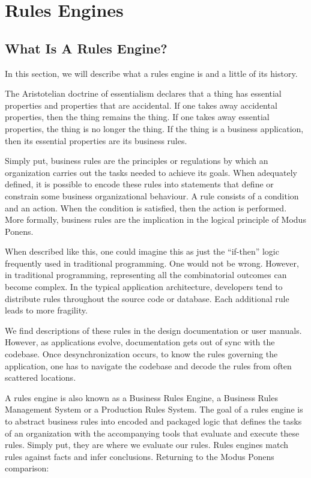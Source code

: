 \section{Rules Engines}

\subsection{What Is A Rules Engine?}

In this section, we will describe what a rules engine is and a little of its history.

The Aristotelian doctrine of essentialism declares that a thing has essential properties and properties that are accidental.
If one takes away accidental properties, then the thing remains the thing.
If one takes away essential properties, the thing is no longer the thing.
If the thing is a business application, then its essential properties are its business rules.

Simply put, business rules are the principles or regulations by which an organization carries out the tasks needed to achieve its goals.
When adequately defined, it is possible to encode these rules into statements that define or constrain some business organizational behaviour.
A rule consists of a condition and an action.
When the condition is satisfied, then the action is performed.
More formally, business rules are the implication in the logical principle of Modus Ponens.

When described like this, one could imagine this as just the ``if-then'' logic frequently used in traditional programming.
One would not be wrong. 
However, in traditional programming, representing all the combinatorial outcomes can become complex.
In the typical application architecture, developers tend to distribute rules throughout the source code or database.
Each additional rule leads to more fragility.

We find descriptions of these rules in the design documentation or user manuals.
However, as applications evolve, documentation gets out of sync with the codebase.
Once desynchronization occurs, to know the rules governing the application, one has to navigate the codebase and decode the rules from often scattered locations.

A rules engine is also known as a Business Rules Engine, a Business Rules Management System or a Production Rules System.
The goal of a rules engine is to abstract business rules into encoded and packaged logic that defines the tasks of an organization with the accompanying tools that evaluate and execute these rules.
Simply put, they are where we evaluate our rules.
Rules engines match rules against facts and infer conclusions.
Returning to the Modus Ponens comparison:

